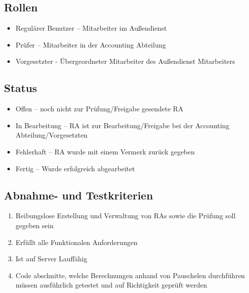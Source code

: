 \subsection{Rollen}
\begin{itemize}
	\item Regulärer Benutzer – Mitarbeiter im Außendienst
	\item Prüfer – Mitarbeiter in der Accounting Abteilung
	\item Vorgesetzter - Übergeordneter Mitarbeiter des Außendienst Mitarbeiters
\end{itemize}

\subsection{Status}
\begin{itemize}
	\item Offen – noch nicht zur Prüfung/Freigabe gesendete RA
	\item In Bearbeitung – RA ist zur Bearbeitung/Freigabe bei der Accounting Abteilung/Vorgesetzten
	\item Fehlerhaft – RA wurde mit einem Vermerk zurück gegeben
	\item Fertig – Wurde erfolgreich abgearbeitet
\end{itemize}

\subsection{Abnahme- und Testkriterien}
\begin{enumerate}
	\item Reibungslose Erstellung und Verwaltung von RAs sowie die Prüfung soll gegeben sein
	\item Erfüllt alle Funktionalen Anforderungen
	\item Ist auf Server Lauffähig
	\item Code abschnitte, welche Berechnungen anhand von Pauschelen durchführen müssen ausführlich getestet und auf Richtigkeit geprüft werden
\end{enumerate}
